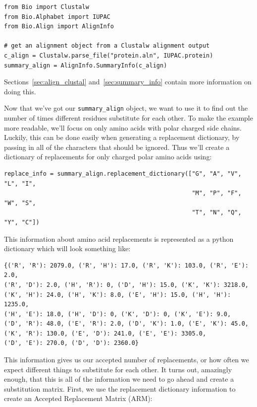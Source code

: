 \documentclass{report}
\begin{document}
\begin{verbatim}
from Bio import Clustalw
from Bio.Alphabet import IUPAC
from Bio.Align import AlignInfo

# get an alignment object from a Clustalw alignment output
c_align = Clustalw.parse_file("protein.aln", IUPAC.protein)
summary_align = AlignInfo.SummaryInfo(c_align)
\end{verbatim}

Sections~\ref{sec:align_clustal} and~\ref{sec:summary_info} contain
more information on doing this.


Now that we've got our \verb|summary_align| object, we want to use it
to find out the number of times different residues substitute for each
other. To make the example more readable, we'll focus on only amino
acids with polar charged side chains. Luckily, this can be done easily 
when generating a replacement dictionary, by passing in all of the
characters that should be ignored. Thus we'll create a dictionary of
replacements for only charged polar amino acids using:

\begin{verbatim}
replace_info = summary_align.replacement_dictionary(["G", "A", "V", "L", "I",
                                                     "M", "P", "F", "W", "S",
                                                     "T", "N", "Q", "Y", "C"])
\end{verbatim}

This information about amino acid replacements is represented as a
python dictionary which will look something like:


\begin{verbatim}
{('R', 'R'): 2079.0, ('R', 'H'): 17.0, ('R', 'K'): 103.0, ('R', 'E'): 2.0, 
('R', 'D'): 2.0, ('H', 'R'): 0, ('D', 'H'): 15.0, ('K', 'K'): 3218.0, 
('K', 'H'): 24.0, ('H', 'K'): 8.0, ('E', 'H'): 15.0, ('H', 'H'): 1235.0, 
('H', 'E'): 18.0, ('H', 'D'): 0, ('K', 'D'): 0, ('K', 'E'): 9.0, 
('D', 'R'): 48.0, ('E', 'R'): 2.0, ('D', 'K'): 1.0, ('E', 'K'): 45.0, 
('K', 'R'): 130.0, ('E', 'D'): 241.0, ('E', 'E'): 3305.0, 
('D', 'E'): 270.0, ('D', 'D'): 2360.0}
\end{verbatim}

This information gives us our accepted number of replacements, or how
often we expect different things to substitute for each other. It
turns out, amazingly enough, that this is all of the information we
need to go ahead and create a substitution matrix. First, we use the
replacement dictionary information to create an Accepted Replacement
Matrix (ARM):
\end{document}
